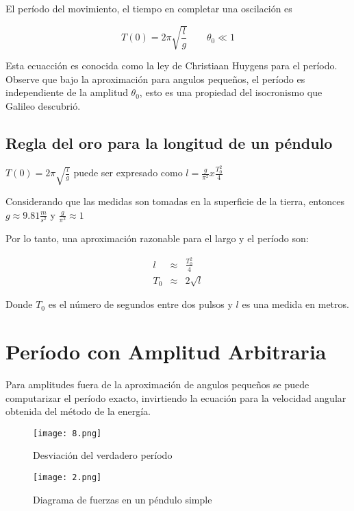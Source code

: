 \documentclass[12pt]{article}
\begin{document}
El período del movimiento, el tiempo en completar una oscilación es

\begin{equation}
\nonumber T(0)= 2\pi \sqrt{\frac{l}{g}} \qquad \theta_0 \ll 1
\end{equation}

Esta ecuacción es conocida como la ley de Christiaan Huygens para el período. Observe que bajo la aproximación para angulos pequeños, el período es independiente de la amplitud $\theta_0$, esto es una propiedad del isocronismo que Galileo descubrió.

\subsection{Regla del oro para la longitud de un péndulo}
$T(0)= 2\pi \sqrt{\frac{l}{g}}$ puede ser expresado como $l= \frac{g}{\pi^2} x \frac{T_0^2}{4}$
	
Considerando que las medidas son tomadas en la superficie de la tierra, entonces $g \approx 9.81 \frac{m}{s^2}$ y $\frac{g}{\pi^2} \approx 1$ 

Por lo tanto, una aproximación razonable para el largo y el período son:

\begin{eqnarray}
\nonumber l & \approx & \frac{T_0^2}{4} \\
\nonumber T_0 & \approx & 2 \sqrt{l}
\end{eqnarray} 

Donde $T_0$ es el número de segundos entre dos pulsos y $l$ es una medida en metros.

\section{Período con Amplitud Arbitraria}
Para amplitudes fuera de la aproximación de angulos pequeños se puede computarizar el período exacto, invirtiendo la ecuación para la velocidad angular obtenida del método de la energía.


\begin{figure}[H]
	\centering
	\texttt{[image: 8.png]}
	\caption{Desviación del verdadero período}
\end{figure}

\begin{figure}[H]
	\centering
	\texttt{[image: 2.png]}
	\caption{Diagrama de fuerzas en un péndulo simple}
\end{figure}
\end{document}
